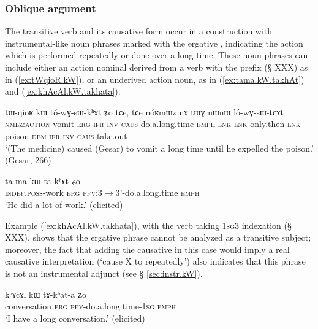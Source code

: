 \subsubsection{Oblique argument} \label{sec:oblique.kW}
 The transitive verb  and its causative form  occur in a construction with instrumental-like noun phrases marked with the ergative , indicating the action which is performed repeatedly or done over a long time. These noun phrases can include either an action nominal derived from a verb with the prefix  (§ XXX) as in (\ref{ex:tWqioR.kW}), or an underived action noun, as in (\ref{ex:tama.kW.takhAt}) and (\ref{ex:khAcAl.kW.takhata}).  
 
  \begin{exe}
\ex \label{ex:tWqioR.kW}
\gll tɯ-qioʁ kɯ tó-wɣ-sɯ-kʰɤt ʑo tɕe, tɕe nóʁmɯz nɤ tɯɣ nɯnɯ ló-wɣ-sɯ-tɕɤt  \\
\textsc{nmlz:action}-vomit \textsc{erg} \textsc{ifr-inv-caus}-do.a.long.time \textsc{emph} \textsc{lnk} \textsc{lnk} only.then \textsc{lnk} poison \textsc{dem} \textsc{ifr-inv-caus}-take.out \\
\glt `(The medicine) caused (Gesar) to vomit a long time until he expelled the poison.' (Gesar, 266)
\end{exe}

  \begin{exe}
\ex \label{ex:tama.kW.takhAt}
\gll ta-ma kɯ ta-kʰɤt ʑo  \\
\textsc{indef.poss}-work \textsc{erg} \textsc{pfv}:3$\rightarrow$3'-do.a.long.time \textsc{emph} \\
\glt `He did a lot of work.' (elicited)
\end{exe}

Example (\ref{ex:khAcAl.kW.takhata}), with the verb   taking \textsc{1sg}\fl{}3 indexation (§ XXX), shows that the ergative phrase cannot be analyzed as a transitive subject; moreover, the fact that adding the causative in this case would imply a real causative interpretation (`cause X to repeatedly') also indicates that this phrase is not an instrumental adjunct (see § \ref{sec:instr.kW}).

  \begin{exe}
\ex \label{ex:khAcAl.kW.takhata}
\gll kʰɤcɤl kɯ tɤ-kʰat-a ʑo \\
conversation \textsc{erg} \textsc{pfv}-do.a.long.time-\textsc{1sg} \textsc{emph} \\
\glt `I have a long conversation.' (elicited)
\end{exe}

